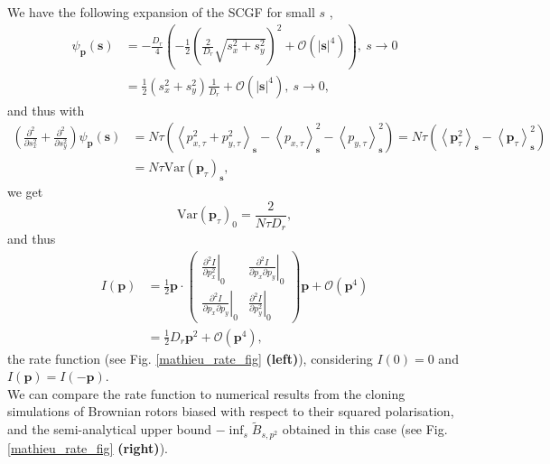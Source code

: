 \documentclass[pre,aps,superscriptaddress,nofootinbib]{revtex4}
\begin{document}
We have the following expansion of the SCGF for small $s$ \cite{abramowitz1948handbook},
\begin{equation}
\begin{aligned}
\psi_{\bm{p}}(\bm{s}) &= - \frac{D_r}{4} \left(-\frac{1}{2} \left(\frac{2}{D_r} \sqrt{s_x^2 + s_y^2}\right)^2 + \mathcal{O}(|\bm{s}|^4)\right),~ s \to 0\\
&= \frac{1}{2} (s_x^2 + s_y^2) \frac{1}{D_r} + \mathcal{O}(|\bm{s}|^4) ,~ s \to 0,
\end{aligned}
\end{equation}
and thus with
\begin{equation}
\begin{aligned}
\left(\frac{\partial^2}{\partial s_x^2} + \frac{\partial^2}{\partial s_y^2}\right) \psi_{\bm{p}}(\bm{s}) &= N \tau \left(\left<p_{x,\tau}^2 + p_{y,\tau}^2\right>_{\bm{s}} - \left<p_{x,\tau}\right>^2_{\bm{s}} - \left<p_{y,\tau}\right>^2_{\bm{s}}\right) = N \tau \left(\left<\bm{p}_{\tau}^2\right>_{\bm{s}} - \left<\bm{p}_{\tau}\right>^2_{\bm{s}}\right)\\
&= N \tau \mathrm{Var}(\bm{p}_{\tau})_{\bm{s}},
\end{aligned}
\end{equation}
we get
\begin{equation}
\mathrm{Var}(\bm{p}_{\tau})_0 = \frac{2}{N \tau D_r},
\end{equation}
and thus
\begin{equation}
\begin{aligned}
I(\bm{p}) &= \frac{1}{2} \bm{p} \cdot \begin{pmatrix} \left. \frac{\partial^2 I}{\partial p_x^2} \right|_0 & \left. \frac{\partial^2 I}{\partial p_x \partial p_y}  \right|_0 \\ \left. \frac{\partial^2 I}{\partial p_x \partial p_y}  \right|_0 & \left. \frac{\partial^2 I}{\partial p_y^2} \right|_0 \end{pmatrix} \bm{p} + \mathcal{O}(\bm{p}^4)\\
&= \frac{1}{2} D_r \bm{p}^2 + \mathcal{O}(\bm{p}^4),
\end{aligned}
\end{equation}
the rate function (see Fig. \ref{mathieu_rate_fig} \textbf{(left)}), considering $I(0) = 0$ and $I(\bm{p}) = I(-\bm{p})$.\\

We can compare the rate function to numerical results from the cloning simulations of Brownian rotors biased with respect to their squared polarisation, and the semi-analytical upper bound $-\inf_s \tilde{B}_{s,p^2}$ obtained in this case \cite{brownian_rotors_ldp} (see Fig. \ref{mathieu_rate_fig} \textbf{(right)}).
\end{document}
